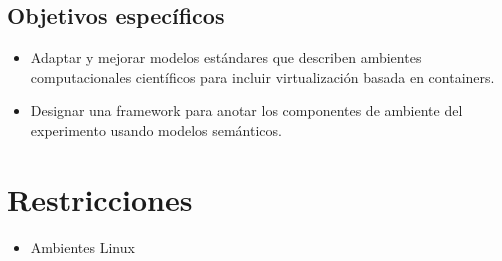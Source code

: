 \subsection{Objetivos específicos}

\begin{itemize}
	\item Adaptar y mejorar modelos estándares que describen ambientes computacionales científicos para incluir virtualización basada en containers.
	\item Designar una framework para anotar los componentes de ambiente del experimento usando modelos semánticos.
\end{itemize}



\section{Restricciones}

\begin{itemize}
	\item Ambientes Linux
\end{itemize}